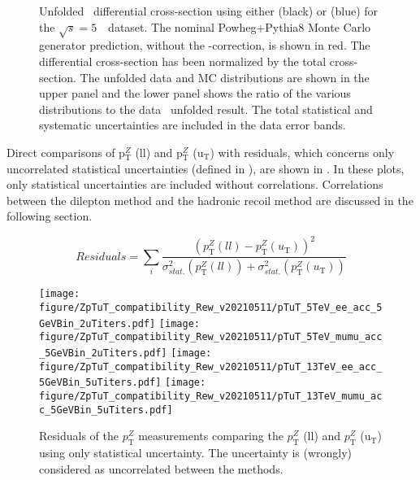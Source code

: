 \begin{figure}[h]
\centering
{}
\caption{Unfolded \ptz\ differential cross-section using either \ptdilep (black) or \ut (blue) for the $\sqrt{s} = 5$~\TeV\ dataset. The nominal Powheg+Pythia8 Monte Carlo generator prediction, without the \pt-correction, is shown in red. The differential cross-section has been normalized by the total cross-section. The unfolded data and MC distributions are shown in the upper panel and the lower panel shows the ratio of the various distributions to the data \ptdilep\ unfolded result. The total statistical and systematic uncertainties are included in the data error bands.}\label{f:unf_pTuT_5coarse}
\end{figure}

Direct comparisons of p$_\mathrm{T}^{Z}$ (ll) and p$_\mathrm{T}^{Z}$ (u$_\mathrm{T}$) with residuals, which concerns only uncorrelated statistical uncertainties (defined in \Eqn{\ref{eq:residuals}}), are shown in  \Fig{\ref{f:DirCompTuTRew}}.
In these plots, only statistical uncertainties are included without correlations.
Correlations between the dilepton method and the hadronic recoil method are discussed in the following section.

\begin{equation}
Residuals = \sum_{i} \frac{(p_\mathrm{T}^{Z} (ll) - p_\mathrm{T}^{Z} (u_\mathrm{T}))^2}{\sigma_{stat.}^2 (p_\mathrm{T}^{Z} (ll) )+\sigma_{stat.}^2 (p_\mathrm{T}^{Z} (u_\mathrm{T}) )}
\label{eq:residuals}
\end{equation}

\begin{figure}[h]
  \centering
  \texttt{[image: figure/ZpTuT\_compatibility\_Rew\_v20210511/pTuT\_5TeV\_ee\_acc\_5GeVBin\_2uTiters.pdf]}
  \texttt{[image: figure/ZpTuT\_compatibility\_Rew\_v20210511/pTuT\_5TeV\_mumu\_acc\_5GeVBin\_2uTiters.pdf]}
  \texttt{[image: figure/ZpTuT\_compatibility\_Rew\_v20210511/pTuT\_13TeV\_ee\_acc\_5GeVBin\_5uTiters.pdf]}
  \texttt{[image: figure/ZpTuT\_compatibility\_Rew\_v20210511/pTuT\_13TeV\_mumu\_acc\_5GeVBin\_5uTiters.pdf]}
  \caption{Residuals of the $p_{\mathrm{T}}^{Z}$ measurements comparing the $p_\mathrm{T}^{Z}$ (ll) and  $p_\mathrm{T}^{Z}$ (u$_\mathrm{T}$) using only statistical uncertainty. The uncertainty is (wrongly) considered as uncorrelated between the methods.}
  \label{f:DirCompTuTRew}
\end{figure}

